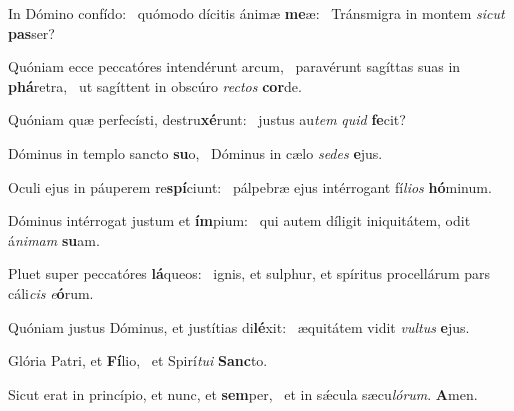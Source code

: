 \item In Dómino confído:~\pscross{} quómodo dícitis ánimæ \textbf{me}æ:~\psstar{} Tránsmigra in montem \textit{sicut} \textbf{pas}ser?
\item Quóniam ecce peccatóres intendérunt arcum,~\pscross{} paravérunt sagíttas suas in \textbf{phá}retra,~\psstar{} ut sagíttent in obscúro \textit{rectos} \textbf{cor}de.
\item Quóniam quæ perfecísti, destru\textbf{xé}runt:~\psstar{} justus au\textit{tem} \textit{quid} \textbf{fe}cit?
\item Dóminus in templo sancto \textbf{su}o,~\psstar{} Dóminus in cælo \textit{sedes} \textbf{e}jus.
\item Oculi ejus in páuperem re\textbf{spí}ciunt:~\psstar{} pálpebræ ejus intérrogant fí\textit{lios} \textbf{hó}minum.
\item Dóminus intérrogat justum et \textbf{ím}pium:~\psstar{} qui autem díligit iniquitátem, odit á\textit{nimam} \textbf{su}am.
\item Pluet super peccatóres \textbf{lá}queos:~\psstar{} ignis, et sulphur, et spíritus procellárum pars cáli\textit{cis} \textit{e}\textbf{ó}rum.
\item Quóniam justus Dóminus, et justítias di\textbf{lé}xit:~\psstar{} æquitátem vidit \textit{vultus} \textbf{e}jus.
\item Glória Patri, et \textbf{Fí}lio,~\psstar{} et Spirí\textit{tui} \textbf{Sanc}to.
\item Sicut erat in princípio, et nunc, et \textbf{sem}per,~\psstar{} et in sǽcula sæcu\textit{lórum}. \textbf{A}men.
